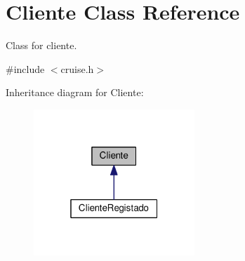 \hypertarget{classCliente}{}\section{Cliente Class Reference}
\label{classCliente}


Class for cliente.  




{\ttfamily \#include $<$cruise.\+h$>$}



Inheritance diagram for Cliente\+:
\nopagebreak
\begin{figure}[H]
\begin{center}
\leavevmode
\includegraphics[width=172pt]{classCliente__inherit__graph}
\end{center}
\end{figure}
